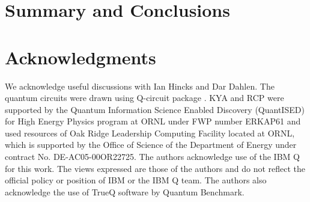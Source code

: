 \section{Summary and Conclusions}


\section{Acknowledgments}


We acknowledge useful discussions with Ian Hincks and Dar Dahlen. The quantum circuits were drawn using Q-circuit package \cite{QCircuit}.
KYA and RCP were supported by the Quantum Information Science Enabled Discovery (QuantISED) for High Energy Physics program at ORNL under FWP number ERKAP61 and used resources of Oak Ridge Leadership Computing Facility located at ORNL, which is supported by the Office of Science of the Department of Energy under contract No. DE-AC05-00OR22725.
 The authors acknowledge use of the IBM Q for this work. The views expressed are those of the authors and do not reflect the official policy or position of IBM or the IBM Q team. The authors also acknowledge the use of TrueQ software by Quantum Benchmark.